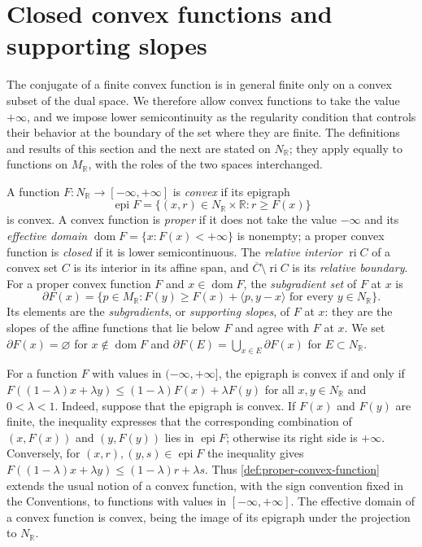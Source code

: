 \section{Closed convex functions and supporting slopes}
\label{sec:closed-convex-functions}
The conjugate of a finite convex function is in general finite only on a convex subset of the dual space. We therefore allow convex functions to take the value $+\infty$, and we impose lower semicontinuity as the regularity condition that controls their behavior at the boundary of the set where they are finite. The definitions and results of this section and the next are stated on $N_{\mathbb R}$; they apply equally to functions on $M_{\mathbb R}$, with the roles of the two spaces interchanged.

\begin{definition}\label{def:proper-convex-function}
A function $F\colon N_{\mathbb R}\to[-\infty,+\infty]$ is \emph{convex} if its epigraph
\[
 \operatorname{epi}F=\{(x,r)\in N_{\mathbb R}\times\mathbb R:r\geq F(x)\}
\]
is convex. A convex function is \emph{proper} if it does not take the value $-\infty$ and its \emph{effective domain} $\operatorname{dom}F=\{x:F(x)<+\infty\}$ is nonempty; a proper convex function is \emph{closed} if it is lower semicontinuous. The \emph{relative interior} $\operatorname{ri}C$ of a convex set $C$ is its interior in its affine span, and $\overline C\setminus\operatorname{ri}C$ is its \emph{relative boundary}. For a proper convex function $F$ and $x\in\operatorname{dom}F$, the \emph{subgradient set} of $F$ at $x$ is
\[
 \partial F(x)=\{p\in M_{\mathbb R}:F(y)\geq F(x)+\langle p,y-x\rangle
                                      \text{ for every }y\in N_{\mathbb R}\}.
\]
Its elements are the \emph{subgradients}, or \emph{supporting slopes}, of $F$ at $x$: they are the slopes of the affine functions that lie below $F$ and agree with $F$ at $x$. We set $\partial F(x)=\varnothing$ for $x\notin\operatorname{dom}F$ and $\partial F(E)=\bigcup_{x\in E}\partial F(x)$ for $E\subset N_{\mathbb R}$.
\end{definition}
For a function $F$ with values in $(-\infty,+\infty]$, the epigraph is convex if and only if $F((1-\lambda)x+\lambda y)\leq(1-\lambda)F(x)+\lambda F(y)$ for all $x,y\in N_{\mathbb R}$ and $0<\lambda<1$. Indeed, suppose that the epigraph is convex. If $F(x)$ and $F(y)$ are finite, the inequality expresses that the corresponding combination of $(x,F(x))$ and $(y,F(y))$ lies in $\operatorname{epi}F$; otherwise its right side is $+\infty$. Conversely, for $(x,r),(y,s)\in\operatorname{epi}F$ the inequality gives $F((1-\lambda)x+\lambda y)\leq(1-\lambda)r+\lambda s$. Thus \cref{def:proper-convex-function} extends the usual notion of a convex function, with the sign convention fixed in the Conventions, to functions with values in $[-\infty,+\infty]$. The effective domain of a convex function is convex, being the image of its epigraph under the projection to $N_{\mathbb R}$.

